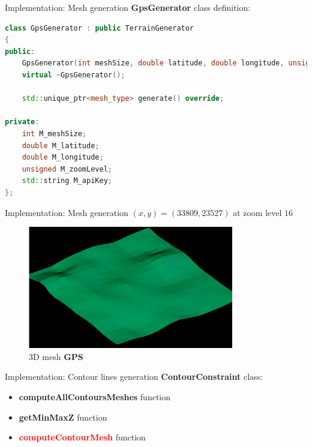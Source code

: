 \documentclass[10pt]{beamer}
\begin{document}
\begin{frame}[fragile]{Implementation: Mesh generation}
  \Large
  \textbf{GpsGenerator} class definition:
  \vspace{1em}
  \begin{lstlisting}[language=C++]
class GpsGenerator : public TerrainGenerator
{
public:
    GpsGenerator(int meshSize, double latitude, double longitude, unsigned zoomLevel, std::string const &apiKey);
    virtual ~GpsGenerator();

    std::unique_ptr<mesh_type> generate() override;

private:
    int M_meshSize;
    double M_latitude;
    double M_longitude;
    unsigned M_zoomLevel;
    std::string M_apiKey;
};
  \end{lstlisting}
\end{frame}

\begin{frame}{Implementation: Mesh generation}
  \centering
  \Large
  $(x, y) = (33809, 23527)$ at zoom level $16$
  \begin{figure}[H]
      \centering
      \includegraphics[width=0.8\textwidth]{images/generated-grenoble-16.png}
      \caption{3D mesh \textbf{GPS}}
  \end{figure}
\end{frame}

\begin{frame}{Implementation: Contour lines generation}
  \Large
  \textbf{ContourConstraint} class:
  \vspace{1em}
  \begin{itemize}
    \item \textbf{computeAllContoursMeshes} function
    \item \textbf{getMinMaxZ} function
    \item \textbf{\textcolor{red}{computeContourMesh}} function
  \end{itemize}
\end{frame}
\end{document}
